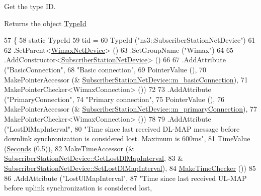 Get the type ID. 

\begin{DoxyReturn}{Returns}
the object \hyperlink{classns3_1_1TypeId}{Type\+Id} 
\end{DoxyReturn}

\begin{DoxyCode}
57 \{
58   \textcolor{keyword}{static} TypeId
59     tid =
60     TypeId (\textcolor{stringliteral}{"ns3::SubscriberStationNetDevice"})
61 
62     .SetParent<\hyperlink{classns3_1_1WimaxNetDevice_ad70bee64c458c43a6f374629dbf85f66}{WimaxNetDevice}> ()
63     .SetGroupName (\textcolor{stringliteral}{"Wimax"})
64 
65     .AddConstructor<\hyperlink{classns3_1_1SubscriberStationNetDevice_a16b528d44054da6a86ea7ee362cd959c}{SubscriberStationNetDevice}> ()
66 
67     .AddAttribute (\textcolor{stringliteral}{"BasicConnection"},
68                    \textcolor{stringliteral}{"Basic connection"},
69                    PointerValue (),
70                    MakePointerAccessor (&
      \hyperlink{classns3_1_1SubscriberStationNetDevice_ae166a9acaa0e8d720a106491ba9ea2fc}{SubscriberStationNetDevice::m\_basicConnection}),
71                    MakePointerChecker<WimaxConnection> ())
72 
73     .AddAttribute (\textcolor{stringliteral}{"PrimaryConnection"},
74                    \textcolor{stringliteral}{"Primary connection"},
75                    PointerValue (),
76                    MakePointerAccessor (&
      \hyperlink{classns3_1_1SubscriberStationNetDevice_a269b0f9be1f02abe86f5a08cf9def186}{SubscriberStationNetDevice::m\_primaryConnection}),
77                    MakePointerChecker<WimaxConnection> ())
78 
79     .AddAttribute (\textcolor{stringliteral}{"LostDlMapInterval"},
80                    \textcolor{stringliteral}{"Time since last received DL-MAP message before downlink synchronization is considered
       lost. Maximum is 600ms"},
81                    TimeValue (\hyperlink{group__timecivil_ga33c34b816f8ff6628e33d5c8e9713b9e}{Seconds} (0.5)),
82                    MakeTimeAccessor (&
      \hyperlink{classns3_1_1SubscriberStationNetDevice_a737de9b42898da37948466c9121c1062}{SubscriberStationNetDevice::GetLostDlMapInterval},
83                                      &
      \hyperlink{classns3_1_1SubscriberStationNetDevice_ab3e45418a327b441cc4a12b6c2522a08}{SubscriberStationNetDevice::SetLostDlMapInterval}),
84                    \hyperlink{group__time_ga7032965bd4afa578691d88c09e4481c1}{MakeTimeChecker} ())
85 
86     .AddAttribute (\textcolor{stringliteral}{"LostUlMapInterval"},
87                    \textcolor{stringliteral}{"Time since last received UL-MAP before uplink synchronization is considered lost,
}
\end{DoxyCode}
